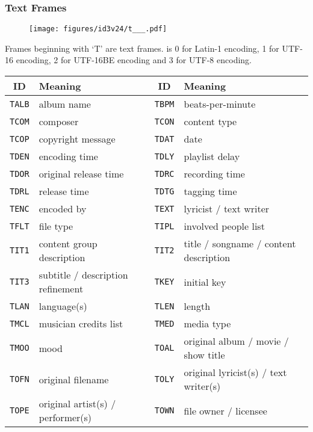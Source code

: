 \subsubsection{Text Frames}
\begin{figure}[h]
  \texttt{[image: figures/id3v24/t\_\_\_.pdf]}
\end{figure}
\par
\noindent
Frames beginning with `T' are text frames.
 is 0 for Latin-1 encoding, 1 for UTF-16 encoding,
2 for UTF-16BE encoding and 3 for UTF-8 encoding.
\begin{table}[h]
  {
    \begin{tabular}{|c|l||c|l|}
      \hline
      ID & Meaning & ID & Meaning \\
      \hline
      \texttt{TALB} & album name &
      \texttt{TBPM} & beats-per-minute \\
      \texttt{TCOM} & composer &
      \texttt{TCON} & content type \\
      \texttt{TCOP} & copyright message &
      \texttt{TDAT} & date \\
      \texttt{TDEN} & encoding time &
      \texttt{TDLY} & playlist delay \\
      \texttt{TDOR} & original release time &
      \texttt{TDRC} & recording time \\
      \texttt{TDRL} & release time &
      \texttt{TDTG} & tagging time \\
      \texttt{TENC} & encoded by &
      \texttt{TEXT} & lyricist / text writer \\
      \texttt{TFLT} & file type &
      \texttt{TIPL} & involved people list \\
      \texttt{TIT1} & content group description &
      \texttt{TIT2} & title / songname / content description \\
      \texttt{TIT3} & subtitle / description refinement &
      \texttt{TKEY} & initial key \\
      \texttt{TLAN} & language(s) &
      \texttt{TLEN} & length \\
      \texttt{TMCL} & musician credits list &
      \texttt{TMED} & media type \\
      \texttt{TMOO} & mood &
      \texttt{TOAL} & original album / movie / show title \\
      \texttt{TOFN} & original filename &
      \texttt{TOLY} & original lyricist(s) / text writer(s) \\
      \texttt{TOPE} & original artist(s) / performer(s) &
      \texttt{TOWN} & file owner / licensee \\

\end{tabular}}
\end{table}
